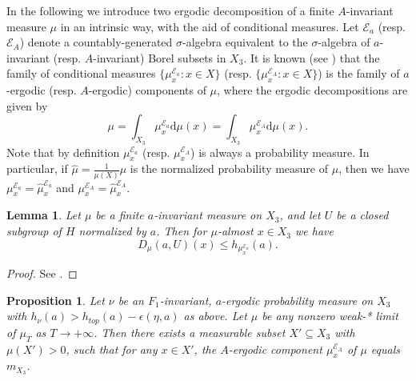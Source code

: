 \documentclass[reqno,12pt]{amsart}
\newtheorem{lemma}[theorem]{Lemma}
\newtheorem{proposition}[theorem]{Proposition}
\theoremstyle{definition}
\numberwithin{equation}{section}
\newcommand{\E}{\mathscr{E}}
\newcommand {\comm}[1]   {\textcolor{red}{#1}}
\newcommand {\neww}[1]   {\textcolor{purple}{#1}}
\begin{document}
{{In the following we introduce two ergodic decomposition of a finite $A$-invariant measure $\mu$ in an intrinsic way, with the aid of conditional measures. Let $\E_a$ (resp. $\E_A$) denote a countably-generated $\sigma$-algebra equivalent to the $\sigma$-algebra of $a$-invariant (resp. $A$-invariant) Borel subsets in $X_3$. It is known (see \cite[Section 5.14]{EL10}) that the family of conditional measures $\{\mu^{\E_a}_x:x\in X\}$ (resp. $\{\mu^{\E_A}_x:x\in X\}$) is the family of $a$-ergodic (resp. $A$-ergodic) components of $\mu$, where the ergodic decompositions are given by $$
\mu=\int_{X_3}\mu^{\E_a}_x\mathrm{d}\mu(x)=\int_{X_3}\mu^{\E_A}_x\mathrm{d}\mu(x).
$$ 
Note that {by definition} $\mu^{\E_a}_x$ (resp. $\mu^{\E_A}_x$) is always a probability measure. In particular, if {$\widehat{\mu} = \frac1{\mu(X)}\mu$} is the normalized probability measure of $\mu$, then we have $\mu^{\E_a}_x=\widehat{\mu}^{\E_a}_x$ {and} $\mu^{\E_A}_x=\widehat{\mu}^{\E_A}_x$.
}

\begin{lemma}\label{L:entropycon}
    Let $\mu$ be a finite $a$-invariant measure on $X_3$, and let $U$ be a closed subgroup of $H$ normalized by $a$. Then for $\mu$-almost $x\in X_3$ we have $$
    D_{\mu}(a,U)(x)\leq h_{\mu^{\E_a}_x}(a).
    $$
\end{lemma}
\begin{proof}
    See \cite[Theorem 7.6(ii)]{EL10}.
\end{proof}

\begin{proposition}\label{partialhaar}
	Let $\nu$ be an $F_1$-invariant, $a$-ergodic probability measure on $X_3$ with $h_{\nu}(a)>h_{top}(a)-\epsilon(\eta,a)$ as above. {Let $\mu$ be any nonzero weak-* limit of $\mu_{T}$ as $T\to +\infty$. Then there exists a measurable subset $X'\subseteq X_3$ with $\mu(X')>0$, such that for any $x\in X'$, the $A$-ergodic component $\mu^{\E_A}_x$ of $\mu$ equals $m_{X_3}$.
    }


\end{proposition}}
\end{document}
